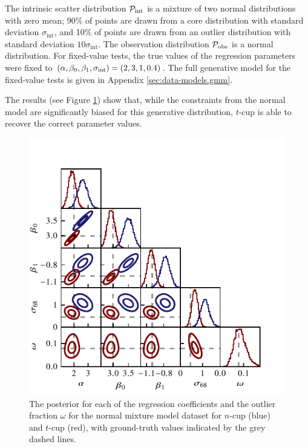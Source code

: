 \documentclass[fleqn,usenatbib]{rasti}
\begin{document}
The intrinsic scatter distribution $\mathcal P_{\rm int}$ is a mixture of two
normal distributions with zero mean; 90\% of points are drawn from a core
distribution with standard deviation $\sigma_\textrm{int}$, and 10\% of points
are drawn from an outlier distribution with standard deviation $10
\sigma_\textrm{int}$. The observation distribution $\mathcal P_{\rm obs}$ is a
normal distribution. For fixed-value tests, the true values of the regression
parameters were fixed to $(\alpha, \beta_0, \beta_1, \sigma_{\rm int}) = (2,
3, 1, 0.4)$. The full generative model for the fixed-value tests is given in
Appendix \ref{sec:data-models.gmm}.

The results (see Figure \ref{fig:results.gmm.corner}) show that, while the
constraints from the normal model are significantly biased for this generative
distribution, $t$-cup is able to recover the correct parameter values.

\begin{figure}
    \includegraphics[width=\columnwidth]{graphics/fixed/corner_gaussian_mix.pdf}
    \caption{The posterior for each of the regression coefficients and the
    outlier fraction $\omega$ for the normal mixture model dataset for $n$-cup
    (blue) and $t$-cup (red), with ground-truth values indicated by the grey
    dashed lines.}
    \label{fig:results.gmm.corner}
\end{figure}
\end{document}
